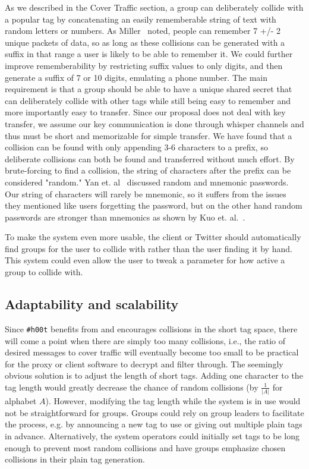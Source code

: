 \documentclass{sig-alternate-arxiv}
\newcommand{\hoot}{{\tt \#h00t}\xspace}
\begin{document}
As we described in the Cover Traffic section, a group can deliberately collide with a popular tag by concatenating an easily rememberable string of text with random letters or numbers. As Miller~\cite{miller56} noted, people can remember  
7 +/- 2 unique packets of data, so as long as these collisions can be generated with a suffix in that range a user is likely to be able to remember it. We could further improve rememberability by restricting suffix values to only digits, and then generate a suffix of 7 or 10 digits, emulating a phone number. The main requirement is that a group should be able to have a unique shared secret that can deliberately collide with other tags while still being easy to remember and more importantly easy to transfer. Since our proposal does not deal with key transfer, we assume our key communication is done through whisper channels and thus must be short and memorizable for simple transfer. We have found that a collision can be found with only appending 3-6 characters to a prefix, so deliberate collisions can both be found and transferred without much effort. By brute-forcing to find a collision, the string of characters after the prefix  can be considered "random." Yan et. al~\cite{yan00} discussed random and mnemonic passwords. Our string of characters will rarely be mnemonic, so it suffers from the issues they mentioned like users forgetting the password, but on the other hand random passwords are stronger than mnemonics as shown by Kuo et. al.~\cite{passwords06}.

To make the system even more usable, the client or Twitter should automatically find groups for the user to collide with rather than the user finding it by hand. This system could even allow the user to tweak a parameter for how active a group to collide with.
\fi



\subsection{Adaptability and scalability}

Since \hoot benefits from and encourages collisions in the short tag
space, there will come a point when there are simply too many
collisions, i.e., the ratio of desired messages to cover traffic will
eventually become too small to be practical for the proxy or client
software to decrypt and filter through. The seemingly obvious solution
is to adjust the length of short tags. Adding one character to the tag
length would greatly decrease the chance of random collisions (by
$\frac{1}{|A|}$ for alphabet $A$). However, modifying the tag length
while the system is in use would not be straightforward for
groups. Groups could rely on group leaders to facilitate the process,
e.g. by announcing a new tag to use or giving out multiple plain tags in
advance. Alternatively, the system operators could initially set tags to
be long enough to prevent most random collisions and have groups
emphasize chosen collisions in their plain tag generation.
\end{document}

